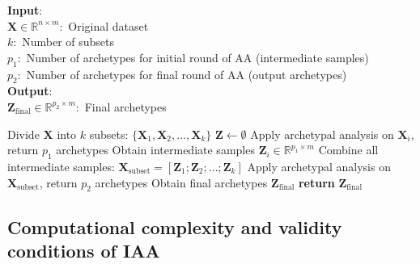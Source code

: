 \documentclass{WileyMSP-template}
\begin{document}
\begin{algorithm}
\caption{Pseudocode of iterative archetypal analysis algorithm.}
\label{alg:redRedIAA}
\begin{flushleft}
    \textbf{Input}: \\
    \hspace*{\algorithmicindent} $\mathbf{X} \in \mathbb{R}^{n \times m}:$ Original dataset \\
    \hspace*{\algorithmicindent} $k:$ Number of subsets \\
    \hspace*{\algorithmicindent} $p_1:$ Number of archetypes for initial round of AA (intermediate samples) \\
    \hspace*{\algorithmicindent} $p_2:$ Number of archetypes for final round of AA (output archetypes) \\
    \textbf{Output}: \\
    \hspace*{\algorithmicindent} $\mathbf{Z}_{\mathrm{final}} \in \mathbb{R}^{p_2 \times m}:$ Final archetypes
\end{flushleft}
\begin{algorithmic}[1]
        \State Divide $\mathbf{X}$ into $k$ subsets: $\{\mathbf{X}_1, \mathbf{X}_2, \ldots, \mathbf{X}_k\}$
        \State $\mathbf{Z} \gets \emptyset$
            \State Apply archetypal analysis on $\mathbf{X}_i$, return $p_1$ archetypes
            \State Obtain intermediate samples $\mathbf{Z}_i \in \mathbb{R}^{p_1 \times m}$
        \EndFor
        \State Combine all intermediate samples: $\mathbf{X}_{\mathrm{subset}} = [\mathbf{Z}_1; \mathbf{Z}_2; \ldots; \mathbf{Z}_k]$
        \State Apply archetypal analysis on $\mathbf{X}_{\mathrm{subset}}$, return $p_2$ archetypes
        \State Obtain final archetypes $\mathbf{Z}_{\mathrm{final}}$
        \State \textbf{return} $\mathbf{Z}_{\mathrm{final}}$
    \EndProcedure
\end{algorithmic}
\end{algorithm}

\subsection{Computational complexity and validity conditions of IAA}
\end{document}
